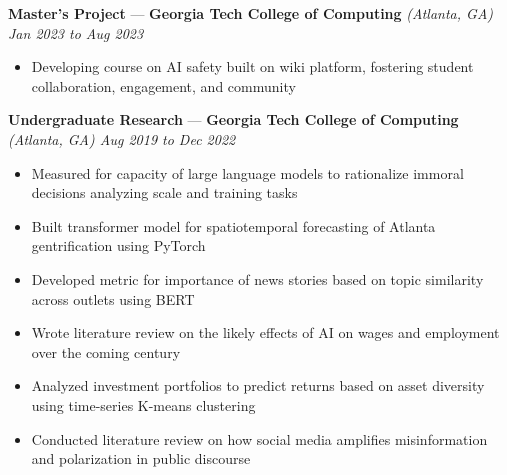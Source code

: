 \documentclass[10pt]{article}
\newcommand{\resumeSubHeading}[4]{
    \vspace*{5pt}
    \textbf{#1} — \textbf{#2} \textsl{(#3) \hfill #4}
}
\begin{document}


\resumeSubHeading
    {Master's Project}
    {Georgia Tech College of Computing}
    {Atlanta, GA}
    {Jan 2023 to Aug 2023}
\begin{itemize}
    \item Developing course on AI safety built on wiki platform, fostering student collaboration, engagement, and community
\end{itemize}

\resumeSubHeading
    {Undergraduate Research}
    {Georgia Tech College of Computing}
    {Atlanta, GA}
    {Aug 2019 to Dec 2022}
\begin{itemize}
    \item Measured for capacity of large language models to rationalize immoral decisions analyzing scale and training tasks
    \item Built transformer model for spatiotemporal forecasting of Atlanta gentrification using PyTorch
    \item Developed metric for importance of news stories based on topic similarity across outlets using BERT
    \item Wrote literature review on the likely effects of AI on wages and employment over the coming century
    \item Analyzed investment portfolios to predict returns based on asset diversity using time-series K-means clustering
    \item Conducted literature review on how social media amplifies misinformation and polarization in public discourse
\end{itemize}
\end{document}
